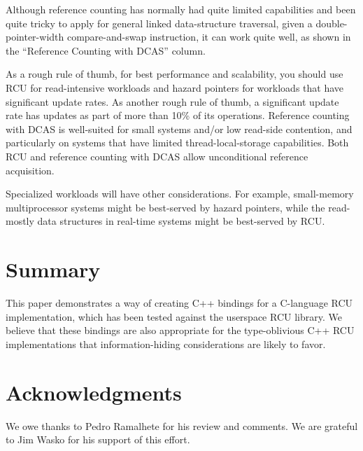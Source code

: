 \documentclass[letterpaper,twocolumn,10pt]{article}
\begin{document}
Although reference counting has normally had quite limited capabilities
and been quite tricky to apply for general linked data-structure
traversal, given a double-pointer-width compare-and-swap instruction,
it can work quite well, as shown in the ``Reference Counting with DCAS''
column.

As a rough rule of thumb, for best performance and scalability, you
should use RCU for read-intensive workloads and hazard pointers for
workloads that have significant update rates.
As another rough rule of thumb, a significant update rate has updates
as part of more than 10\% of its operations.
Reference counting with DCAS is well-suited for small systems and/or
low read-side contention, and particularly on systems that have limited
thread-local-storage capabilities.
Both RCU and reference counting with DCAS allow unconditional reference
acquisition.

Specialized workloads will have other considerations.
For example, small-memory multiprocessor systems might be best-served by
hazard pointers, while the read-mostly data structures in real-time
systems might be best-served by RCU.

\section{Summary}
\label{sec:Summary}

This paper demonstrates a way of creating C++ bindings for a C-language
RCU implementation, which has been tested against the userspace RCU
library.
We believe that these bindings are also appropriate for the type-oblivious
C++ RCU implementations that information-hiding considerations are likely
to favor.

\section*{Acknowledgments}

We owe thanks to Pedro Ramalhete for his review and comments.
We are grateful to Jim Wasko for his support of this effort.

%
%

%







\end{document}
